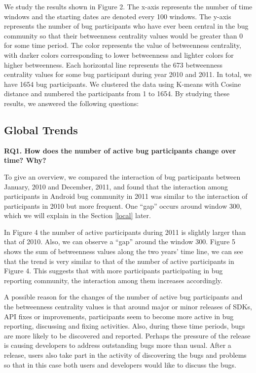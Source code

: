\documentclass[conference]{IEEEtran}
\begin{document}
We study the results shown in Figure 2. The x-axis represents the
number of time windows and the starting dates are denoted every 100
windows. The y-axis represents the number of bug participants who have
ever been central in the bug community so that their betweenness
centrality values would be greater than 0 for some time period. The
color represents the value of betweenness centrality, with darker
colors corresponding to lower betweenness and lighter colors for
higher betweenness. Each horizontal line represents the 673 betweenness
centrality values for some bug participant during year 2010 and
2011. In total, we have 1654 bug participants. We clustered the data
using K-means with Cosine distance and numbered the participants from
1 to 1654. By studying these results, we answered the
following questions:


\subsection{Global Trends}

\textbf{RQ1. How does the number of active bug participants change over time? Why?}

To give an overview, we compared the interaction of bug participants
between January, 2010 and December, 2011, and found that the
interaction among participants in Android bug community in 2011 was similar
to the interaction of participants in 2010 but more frequent. One
``gap'' occurs around window 300,
which we will explain in the Section \ref{local} later. 


In Figure 4 the number of active participants
during 2011 is slightly larger than that of 2010. Also, we can observe
a ``gap'' around the window
300. Figure 5 shows the sum of betweenness values along the two years'
time line, we can see that the trend is very similar to that of the
number of active participants in Figure 4. This suggests that with more
participants participating in bug reporting community, the interaction among
them increases accordingly.


A possible reason for the changes of the number of active bug participants
and the betweenness centrality values is that around major or minor
releases of SDKs, API fixes or improvements, participants seem to become more
active in bug reporting, discussing and fixing
activities. Also, during these time periods, bugs are more likely to
be discovered and reported. 
Perhaps the pressure of the release is 
causing developers to address outstanding bugs more than usual.
After a
release, users also take part in the activity of
discovering the bugs and problems so that in this case both users and
developers would like to discuss the bugs. 
\end{document}
